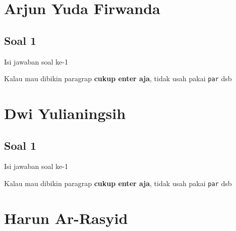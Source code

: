 \section{Arjun Yuda Firwanda}
\subsection{Soal 1}
Isi jawaban soal ke-1

Kalau mau dibikin paragrap \textbf{cukup enter aja}, tidak usah pakai \verb|par| dsb



\section{Dwi Yulianingsih}
\subsection{Soal 1}
Isi jawaban soal ke-1

Kalau mau dibikin paragrap \textbf{cukup enter aja}, tidak usah pakai \verb|par| dsb


\section{Harun Ar-Rasyid}
